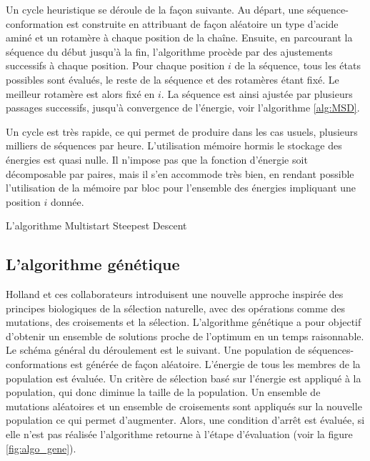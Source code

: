 Un cycle heuristique se déroule de la façon suivante. Au départ, une séquence-conformation est construite en attribuant de façon aléatoire un type d'acide aminé et un rotamère à chaque position de la chaîne. Ensuite, en parcourant la séquence du début jusqu'à la fin, l'algorithme procède par des ajustements successifs à chaque position. Pour chaque position $i$ de la séquence, tous les états possibles sont évalués, le reste de la séquence et des rotamères étant fixé. Le meilleur rotamère est alors fixé en $i$. La séquence est ainsi ajustée par plusieurs passages successifs, jusqu'à convergence de l'énergie, voir l'algorithme \ref{alg:MSD}.

Un cycle est très rapide, ce qui permet de produire dans les cas usuels, plusieurs milliers de séquences par heure. L'utilisation mémoire hormis le stockage des énergies est quasi nulle. Il n'impose pas que la fonction d'énergie soit décomposable par paires, mais il s'en accommode très bien, en rendant possible l'utilisation de la mémoire par bloc pour l'ensemble des énergies impliquant une position $i$ donnée.

\begin{algorithm}
  \caption{L'algorithme Multistart Steepest Descent}\label{alg:MSD}
\end{algorithm}


\subsection{L'algorithme génétique}


Holland et ces collaborateurs \cite{Goldberg88} introduisent une nouvelle approche inspirée des principes biologiques de la sélection naturelle, avec des opérations comme des mutations, des croisements et la sélection. L'algorithme génétique a pour objectif d'obtenir un ensemble de solutions proche de l'optimum en un temps raisonnable.
Le schéma général du déroulement est le suivant. Une population de séquences-conformations est générée de façon aléatoire. L'énergie de tous les membres de la population est évaluée. Un critère de sélection basé sur l'énergie est appliqué à la population, qui donc diminue la taille de la population. Un ensemble de mutations aléatoires et un ensemble de croisements sont appliqués sur la nouvelle population ce qui permet d'augmenter. Alors, une condition d'arrêt est évaluée, si elle n'est pas réalisée l'algorithme retourne à l'étape d'évaluation (voir la figure \ref{fig:algo_gene}). 

